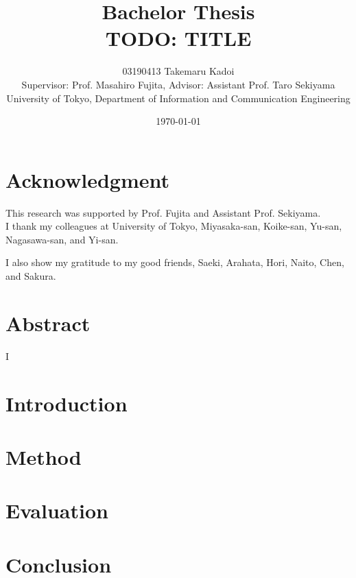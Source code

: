 \documentclass[10pt, a4paper, titlepage]{article}
\title{Bachelor Thesis \\ TODO: TITLE}
\author{
03190413 Takemaru Kadoi 
\\[1cm]
{\small Supervisor: Prof. Masahiro Fujita},
{\small Advisor: Assistant Prof. Taro Sekiyama}
\\[1cm]
{\small University of Tokyo, Department of Information and Communication Engineering}}
\date{\today}
\begin{document}
\maketitle
\newpage
\tableofcontents
\newpage

\section{Acknowledgment} %
This research was supported by Prof. Fujita and Assistant Prof. Sekiyama. \\
I thank my colleagues at University of Tokyo, Miyasaka-san, Koike-san, Yu-san, Nagasawa-san, and Yi-san.

I also show my gratitude to my good friends, Saeki, Arahata, Hori, Naito, Chen, and Sakura.

\section{Abstract} %

I \cite{gulwani2017program}
\section{Introduction} %
\section{Method} %
\section{Evaluation} %
\section{Conclusion} %


\end{document}
